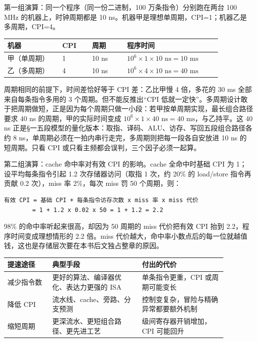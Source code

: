 第一组演算：同一个程序（同一份二进制，100 万条指令）分别跑在两台 100 MHz 的机器上，时钟周期都是 10 ns。机器甲是理想单周期，CPI=1；机器乙是多周期，CPI=4。

\begin{longtable}{L{0.22\linewidth}L{0.12\linewidth}L{0.14\linewidth}L{0.38\linewidth}}
\toprule
机器 & CPI & 周期 & 程序时间 \\
\midrule
甲（单周期） & 1 & 10 ns & $10^6 \times 1 \times 10\text{ ns} = 10\text{ ms}$ \\
乙（多周期） & 4 & 10 ns & $10^6 \times 4 \times 10\text{ ns} = 40\text{ ms}$ \\
\bottomrule
\end{longtable}

周期相同的前提下，时间差恰好等于 CPI 差：乙比甲慢 4 倍，多花的 30 ms 全部来自每条指令多用的 3 个周期。但不能反推出“CPI 低就一定快”。多周期设计敢于把周期做短，正是因为每个周期只做一小段：若甲按单周期实现，最长组合路径要求 40 ns 的周期，甲的实际时间变成 $10^6 \times 1 \times 40\text{ ns} = 40\text{ ms}$，与乙持平。这 40 ns 正是§一五段模型的量化版本：取指、译码、ALU、访存、写回五段组合路径各约 8 ns，单周期必须在一拍内串行走完，多周期则把每一段各自安放进 10 ns 的短周期。只看 CPI 或只看主频都会误判，三个因子必须一起算。

第二组演算：cache 命中率对有效 CPI 的影响。cache 全命中时基础 CPI 为 1；设平均每条指令引起 1.2 次存储器访问（取指 1 次，约 20\% 的 load/store 指令再贡献 0.2 次），miss 率 2\%，每次 miss 罚 50 个周期，则：

\begin{lstlisting}
有效 CPI = 基础 CPI + 每条指令访存次数 x miss 率 x miss 代价
        = 1 + 1.2 x 0.02 x 50 = 1 + 1.2 = 2.2
\end{lstlisting}

98\% 的命中率听起来很高，却因为 50 周期的 miss 代价把有效 CPI 抬到 2.2，程序时间变成理想情形的 2.2 倍。miss 代价越大，命中率小数点后的每一位就越值钱，这也是存储层次要在本书后文独占整章的原因。

\begin{longtable}{L{0.18\linewidth}L{0.36\linewidth}L{0.34\linewidth}}
\toprule
提速途径 & 典型手段 & 付出的代价 \\
\midrule
减少指令数 & 更好的算法、编译器优化、表达力更强的 ISA & 单条指令更重，CPI 或周期可能变长 \\
降低 CPI & 流水线、cache、旁路、分支预测 & 控制变复杂，冒险与精确异常都要额外机制 \\
缩短周期 & 更深流水、更短组合路径、更先进工艺 & 级间寄存器开销增加，CPI 可能回升 \\
\bottomrule
\end{longtable}

